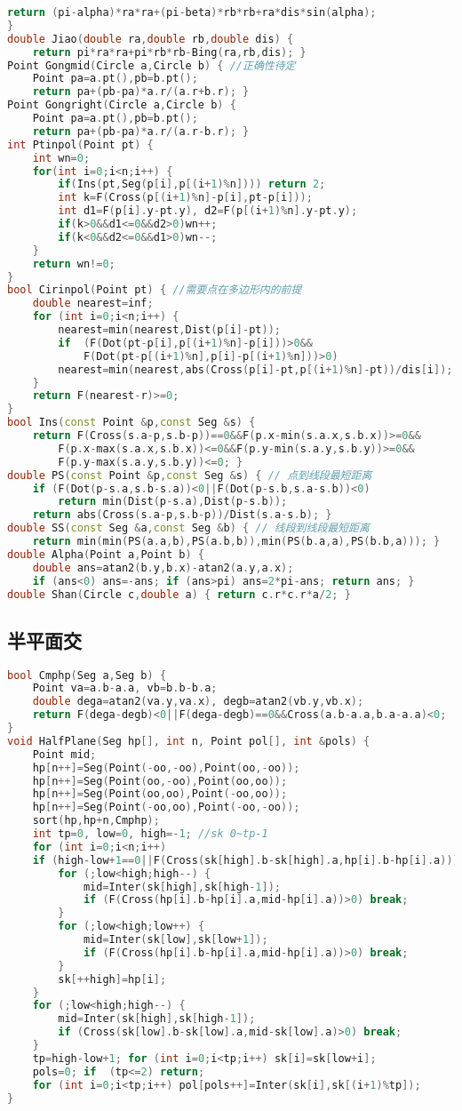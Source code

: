 \documentclass[landscape,a4paper]{article}
\begin{document}
\begin{lstlisting}[language=C++]
	return (pi-alpha)*ra*ra+(pi-beta)*rb*rb+ra*dis*sin(alpha);
}
double Jiao(double ra,double rb,double dis) {
	return pi*ra*ra+pi*rb*rb-Bing(ra,rb,dis); }
Point Gongmid(Circle a,Circle b) { //正确性待定
	Point pa=a.pt(),pb=b.pt();
	return pa+(pb-pa)*a.r/(a.r+b.r); }
Point Gongright(Circle a,Circle b) {
	Point pa=a.pt(),pb=b.pt();
	return pa+(pb-pa)*a.r/(a.r-b.r); }
int Ptinpol(Point pt) {
	int wn=0;
    for(int i=0;i<n;i++) {
        if(Ins(pt,Seg(p[i],p[(i+1)%n]))) return 2;
        int k=F(Cross(p[(i+1)%n]-p[i],pt-p[i]));
        int d1=F(p[i].y-pt.y), d2=F(p[(i+1)%n].y-pt.y);
        if(k>0&&d1<=0&&d2>0)wn++;
        if(k<0&&d2<=0&&d1>0)wn--;
    }
    return wn!=0;
}
bool Cirinpol(Point pt) { //需要点在多边形内的前提
	double nearest=inf;
	for (int i=0;i<n;i++) {
		nearest=min(nearest,Dist(p[i]-pt));
		if  (F(Dot(pt-p[i],p[(i+1)%n]-p[i]))>0&&
			F(Dot(pt-p[(i+1)%n],p[i]-p[(i+1)%n]))>0)
		nearest=min(nearest,abs(Cross(p[i]-pt,p[(i+1)%n]-pt))/dis[i]);
	}
	return F(nearest-r)>=0;
}
bool Ins(const Point &p,const Seg &s) {
	return F(Cross(s.a-p,s.b-p))==0&&F(p.x-min(s.a.x,s.b.x))>=0&&
		F(p.x-max(s.a.x,s.b.x))<=0&&F(p.y-min(s.a.y,s.b.y))>=0&&
		F(p.y-max(s.a.y,s.b.y))<=0; }
double PS(const Point &p,const Seg &s) { // 点到线段最短距离
	if (F(Dot(p-s.a,s.b-s.a))<0||F(Dot(p-s.b,s.a-s.b))<0)
		return min(Dist(p-s.a),Dist(p-s.b));
	return abs(Cross(s.a-p,s.b-p))/Dist(s.a-s.b); }
double SS(const Seg &a,const Seg &b) { // 线段到线段最短距离
	return min(min(PS(a.a,b),PS(a.b,b)),min(PS(b.a,a),PS(b.b,a))); }
double Alpha(Point a,Point b) {
	double ans=atan2(b.y,b.x)-atan2(a.y,a.x);
	if (ans<0) ans=-ans; if (ans>pi) ans=2*pi-ans; return ans; }
double Shan(Circle c,double a) { return c.r*c.r*a/2; }
\end{lstlisting}

\subsection{半平面交}
\begin{lstlisting}[language=C++]
bool Cmphp(Seg a,Seg b) {
	Point va=a.b-a.a, vb=b.b-b.a;
    double dega=atan2(va.y,va.x), degb=atan2(vb.y,vb.x);
	return F(dega-degb)<0||F(dega-degb)==0&&Cross(a.b-a.a,b.a-a.a)<0;
}
void HalfPlane(Seg hp[], int n, Point pol[], int &pols) {
	Point mid;
	hp[n++]=Seg(Point(-oo,-oo),Point(oo,-oo));
	hp[n++]=Seg(Point(oo,-oo),Point(oo,oo));
	hp[n++]=Seg(Point(oo,oo),Point(-oo,oo));
	hp[n++]=Seg(Point(-oo,oo),Point(-oo,-oo));
	sort(hp,hp+n,Cmphp);
	int tp=0, low=0, high=-1; //sk 0~tp-1
	for (int i=0;i<n;i++)
	if (high-low+1==0||F(Cross(sk[high].b-sk[high].a,hp[i].b-hp[i].a))) {
		for (;low<high;high--) {
			mid=Inter(sk[high],sk[high-1]);
			if (F(Cross(hp[i].b-hp[i].a,mid-hp[i].a))>0) break;
		}
		for (;low<high;low++) {
			mid=Inter(sk[low],sk[low+1]);
			if (F(Cross(hp[i].b-hp[i].a,mid-hp[i].a))>0) break;
		}
		sk[++high]=hp[i];
	}
	for (;low<high;high--) {
		mid=Inter(sk[high],sk[high-1]);
		if (Cross(sk[low].b-sk[low].a,mid-sk[low].a)>0) break;
	}
	tp=high-low+1; for (int i=0;i<tp;i++) sk[i]=sk[low+i];
	pols=0; if  (tp<=2) return;
	for (int i=0;i<tp;i++) pol[pols++]=Inter(sk[i],sk[(i+1)%tp]);
}
\end{lstlisting}
\end{document}
